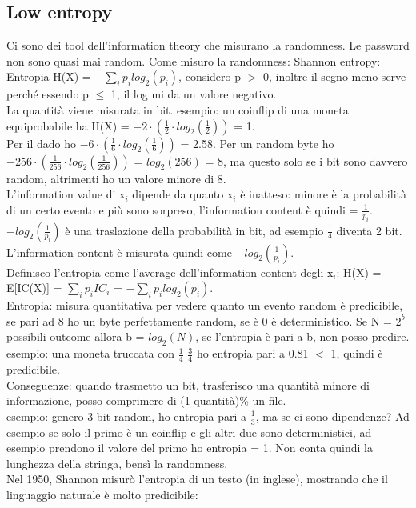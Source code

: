 \documentclass[16px]{article}
\begin{document}
\subsection{Low entropy}
Ci sono dei tool dell'information theory che misurano la randomness. Le password non sono quasi mai random. Come misuro la randomness: Shannon entropy:
Entropia H(X) = $-\sum\limits_{i}p_{i}log_{2}(p_{i})$, considero p $>$ 0, inoltre il segno meno serve perché essendo p $\leq$ 1, il log mi da un valore negativo.\\ La quantità viene misurata in bit. esempio: un coinflip di una moneta equiprobabile ha H(X) = $-2 \cdot (\frac{1}{2} \cdot log_{2}(\frac{1}{2}))$ = 1.\\ Per il dado ho $-6 \cdot (\frac{1}{6} \cdot log_{2}(\frac{1}{6}))$ = 2.58. Per un random byte ho $-256 \cdot (\frac{1}{256} \cdot log_{2}(\frac{1}{256}))$ = $log_{2}(256)$ = 8, ma questo solo se i bit sono davvero random, altrimenti ho un valore minore di 8.\\ L'information value di x$_{i}$ dipende da quanto x$_{i}$ è inatteso: minore è la probabilità di un certo evento e più sono sorpreso, l'information content è quindi = $\frac{1}{p_{i}}$.\\ $-log_{2}(\frac{1}{p_{i}})$ è una traslazione della probabilità in bit, ad esempio $\frac{1}{4}$ diventa 2 bit. L'information content è misurata quindi come $-log_{2}(\frac{1}{p_{i}})$.\\ Definisco l'entropia come l'average dell'information content degli x$_{i}$: H(X) = E[IC(X)] = $\sum\limits_{i}p_{i}IC_{i}$ = $-\sum\limits_{i}p_{i}log_{2}(p_{i})$.\\ Entropia: misura quantitativa per vedere quanto un evento random è predicibile, se pari ad 8 ho un byte perfettamente random, se è 0 è deterministico. Se N = $2^b$ possibili outcome allora b = $log_{2}(N)$, se l'entropia è pari a b, non posso predire. esempio: una moneta truccata con $\frac{1}{4}$ $\frac{3}{4}$ ho entropia pari a 0.81 $<$ 1, quindi è predicibile.\\ Conseguenze: quando trasmetto un bit, trasferisco una quantità minore di informazione, posso comprimere di (1-quantità)\% un file.\\
esempio: genero 3 bit random, ho entropia pari a $\frac{1}{3}$, ma se ci sono dipendenze? Ad esempio se solo il primo è un coinflip e gli altri due sono deterministici, ad esempio prendono il valore del primo ho entropia = 1. Non conta quindi la lunghezza della stringa, bensì la randomness.\\ Nel 1950, Shannon misurò l'entropia di un testo (in inglese), mostrando che il linguaggio naturale è molto predicibile:\\
\end{document}
